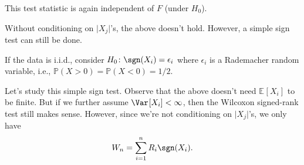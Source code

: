 \begin{note}
	This test statistic is again independent of \(F\) (under \(H_0\)).
\end{note}

Without conditioning on \(\vert X_j \vert \)'s, the above doesn't hold. However, a simple sign test can still be done.

\begin{eg}
	If the data is i.i.d., consider \(H_0 \colon \sgn (X_i) = \epsilon _i\) where \(\epsilon _i\) is a Rademacher random variable, i.e., \(\mathbb{P} (X > 0) = \mathbb{P} (X < 0) = 1 / 2\).
\end{eg}

Let's study this simple sign test. Observe that the above doesn't need \(\mathbb{E}_{}[X_i] \) to be finite. But if we further assume \(\Var_{}[X_i] < \infty \), then the Wilcoxon signed-rank test still makes sense. However, since we're not conditioning on \(\vert X_j \vert \)'s, we only have
\[
	W_n = \sum_{i=1}^{n} R_i \sgn (X_i).
\]

